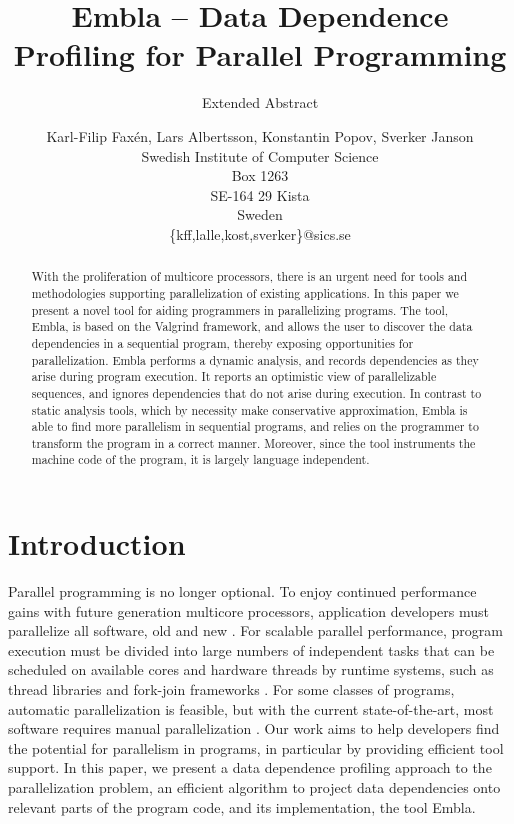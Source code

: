 \documentclass{acm_proc_article-sp}
\begin{document}
\title{Embla -- Data Dependence Profiling for Parallel Programming }
\subtitle{Extended Abstract}
\author{Karl-Filip Fax\'en, Lars Albertsson, Konstantin Popov, Sverker Janson\\
       Swedish Institute of Computer Science\\
       Box 1263\\
       SE-164 29 Kista\\
       Sweden\\
       \{kff,lalle,kost,sverker\}@sics.se}
\date{}
\maketitle

\begin{abstract}

With the proliferation of multicore processors, there is an urgent need for
tools and methodologies supporting parallelization of existing
applications.  In this paper we present a novel tool for aiding
programmers in parallelizing programs. The tool, Embla, is based on the
Valgrind framework, and allows the user to
discover the data dependencies in a sequential program, thereby exposing
opportunities for parallelization.  Embla performs a dynamic analysis,
and records dependencies as they
arise during program execution.  It reports an optimistic view of
parallelizable sequences, and ignores dependencies that do not arise during
execution.  In contrast to static analysis tools,
which by necessity make conservative approximation, Embla is able to find
more parallelism in sequential programs, and relies on the programmer to
transform the program in a correct manner. 
Moreover, since the tool instruments the machine code of the program,
it is largely language independent. 

\end{abstract}


\section{Introduction}

Parallel programming is no longer optional.  To enjoy continued
performance gains with future generation multicore processors,
application developers must parallelize all software, old and new
\cite{TEL95,ONHWC96,KAB03,Sutter05}.  For scalable parallel
performance, program execution must be divided into large numbers of
independent tasks that can be scheduled on available cores and
hardware threads by runtime systems, such as thread libraries and
fork-join frameworks \cite{}.  For some classes of programs, automatic
parallelization is feasible, but with the current state-of-the-art,
most software requires manual parallelization \cite{}. 
Our work aims to help developers find the potential for parallelism in 
programs, in particular by providing efficient tool support.
In this paper, we
present a data dependence profiling approach to the parallelization
problem, an efficient algorithm to project data dependencies onto
relevant parts of the program code, and its implementation, the tool
Embla.
\end{document}
